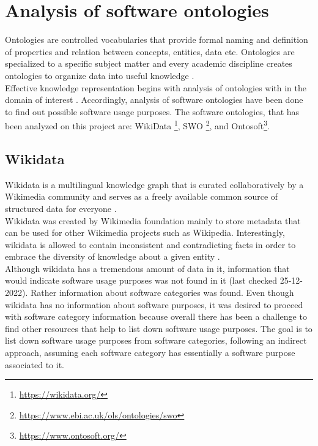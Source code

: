 \section{Analysis of software ontologies }
\label{sec:purpose:ontologies}

Ontologies are controlled vocabularies that provide formal naming and definition of properties and relation between concepts, entities, data etc.  Ontologies  are specialized  to a specific subject matter and every academic discipline creates ontologies to organize data into useful knowledge \citep{enwiki:1060388948}. \\

Effective knowledge representation begins with analysis of ontologies with in the domain of interest \citep{chandrasekaran1999ontologies}. Accordingly, analysis of software ontologies have been done to find out possible software usage purposes. The software ontologies, that has been analyzed on this project are: WikiData \footnote{\url{https://wikidata.org/}}, \ac{SWO} \footnote{\url{https://www.ebi.ac.uk/ols/ontologies/swo}}, and Ontosoft\footnote{\url{https://www.ontosoft.org/}}. 

 
\subsection{Wikidata}
\label{subsec:purpose:ontologies:Wikidata}

Wikidata is a multilingual knowledge graph that is curated collaboratively by a Wikimedia community and serves as a freely available common source of structured data for everyone \citep{enwiki:1060114687, enwiki:1060408581}. \\

Wikidata was created by Wikimedia foundation mainly to store metadata that can be used for other Wikimedia projects such as Wikipedia. Interestingly, wikidata is allowed to contain inconsistent and contradicting facts in order to embrace the diversity of knowledge about a given entity \citep{vrandevcic2012wikidata}. \\

Although wikidata has a tremendous amount of data in it, information that would indicate software usage purposes was not found in it (last checked 25-12-2022). Rather information about software categories was found. Even though wikidata has no information about software purposes, it was desired to proceed with software category information because overall there has been a challenge to find other resources that help to list down software usage purposes. The goal is to list down software usage purposes from software categories, following an indirect approach, assuming each software category has essentially a software purpose associated to it. \\

